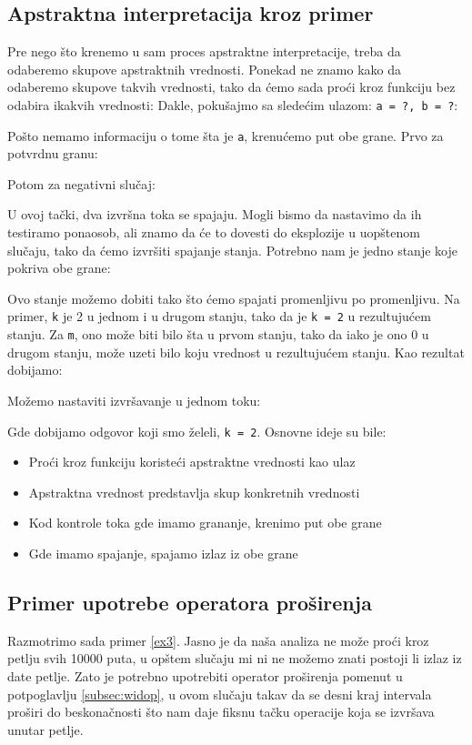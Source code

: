\subsection{Apstraktna interpretacija kroz primer}
\label{subsec:absintex}
Pre nego što krenemo u sam proces apstraktne interpretacije, treba da odaberemo
skupove apstraktnih vrednosti. Ponekad ne znamo kako da odaberemo skupove takvih
vrednosti, tako da ćemo sada proći kroz funkciju bez odabira ikakvih vrednosti:
Dakle, pokušajmo sa sledećim ulazom: \texttt{a = ?, b = ?}:

Pošto nemamo informaciju o tome šta je \texttt{a}, krenućemo put obe grane.
Prvo za potvrdnu granu:

Potom za negativni slučaj:

U ovoj tački, dva izvršna toka se spajaju. Mogli bismo da nastavimo da ih testiramo
ponaosob, ali znamo da će to dovesti do eksplozije u uopštenom slučaju, tako da ćemo
izvršiti spajanje stanja. Potrebno nam je jedno stanje koje pokriva obe grane:

Ovo stanje možemo dobiti tako što ćemo spajati promenljivu po promenljivu. Na primer,
\texttt{k} je 2 u jednom i u drugom stanju, tako da je \texttt{k = 2} u rezultujućem
stanju. Za \texttt{m}, ono može biti bilo šta u prvom stanju, tako da iako je ono 0
u drugom stanju, može uzeti bilo koju vrednost u rezultujućem stanju. Kao rezultat dobijamo:

Možemo nastaviti izvršavanje u jednom toku:

Gde dobijamo odgovor koji smo želeli, \texttt{k = 2}. Osnovne ideje su bile:
\begin{itemize}
\item Proći kroz funkciju koristeći apstraktne vrednosti kao ulaz
\item Apstraktna vrednost predstavlja skup konkretnih vrednosti
\item Kod kontrole toka gde imamo grananje, krenimo put obe grane
\item Gde imamo spajanje, spajamo izlaz iz obe grane
\end{itemize}
\cite{MozWiki}

\subsection{Primer upotrebe operatora proširenja}
\label{subsec:widening}

Razmotrimo sada primer \ref{ex3}. Jasno je da naša analiza ne može proći kroz petlju svih 10000 puta, u opštem slučaju mi ni ne možemo znati postoji li izlaz iz date petlje. Zato je potrebno upotrebiti operator proširenja pomenut u potpoglavlju \ref{subsec:widop}, u ovom slučaju takav da se desni kraj intervala proširi do beskonačnosti što nam daje fiksnu tačku operacije koja se izvršava unutar petlje. 

